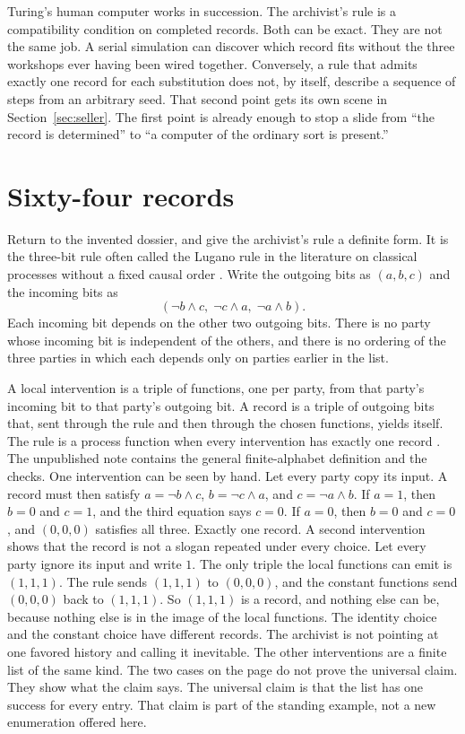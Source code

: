 \documentclass[11pt]{article}
\begin{document}
Turing’s human computer works in succession. The archivist’s rule is a compatibility condition on completed records. Both can be exact. They are not the same job. A serial simulation can discover which record fits without the three workshops ever having been wired together. Conversely, a rule that admits exactly one record for each substitution does not, by itself, describe a sequence of steps from an arbitrary seed. That second point gets its own scene in Section~\ref{sec:seller}. The first point is already enough to stop a slide from ``the record is determined'' to ``a computer of the ordinary sort is present.''

\section{Sixty-four records}
\label{sec:dossier}

Return to the invented dossier, and give the archivist’s rule a definite form. It is the three-bit rule often called the Lugano rule in the literature on classical processes without a fixed causal order \citep{baumeler2016,baumeler2019}. Write the outgoing bits as \((a,b,c)\) and the incoming bits as
\[
(\lnot b \land c,\; \lnot c \land a,\; \lnot a \land b).
\]
Each incoming bit depends on the other two outgoing bits. There is no party whose incoming bit is independent of the others, and there is no ordering of the three parties in which each depends only on parties earlier in the list.

A local intervention is a triple of functions, one per party, from that party’s incoming bit to that party’s outgoing bit. A record is a triple of outgoing bits that, sent through the rule and then through the chosen functions, yields itself. The rule is a process function when every intervention has exactly one record \citep{baumeler2016}. The unpublished note contains the general finite-alphabet definition and the checks. One intervention can be seen by hand. Let every party copy its input. A record must then satisfy \(a = \lnot b \land c\), \(b = \lnot c \land a\), and \(c = \lnot a \land b\). If \(a = 1\), then \(b = 0\) and \(c = 1\), and the third equation says \(c = 0\). If \(a = 0\), then \(b = 0\) and \(c = 0\), and \((0,0,0)\) satisfies all three. Exactly one record. A second intervention shows that the record is not a slogan repeated under every choice. Let every party ignore its input and write \(1\). The only triple the local functions can emit is \((1,1,1)\). The rule sends \((1,1,1)\) to \((0,0,0)\), and the constant functions send \((0,0,0)\) back to \((1,1,1)\). So \((1,1,1)\) is a record, and nothing else can be, because nothing else is in the image of the local functions. The identity choice and the constant choice have different records. The archivist is not pointing at one favored history and calling it inevitable. The other interventions are a finite list of the same kind. The two cases on the page do not prove the universal claim. They show what the claim says. The universal claim is that the list has one success for every entry. That claim is part of the standing example, not a new enumeration offered here.
\end{document}
